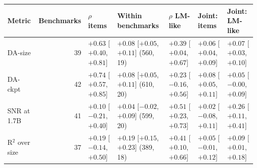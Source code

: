 \begin{tabular}{lrlllll}
\toprule
Metric & Benchmarks & $\rho$ items & Within benchmarks & $\rho$ LM-like & Joint: items & Joint: LM-like \\
\midrule
DA-size & 39 & $+0.63$ [$+0.40$, $+0.81$] & $+0.08$ [$+0.05$, $+0.11$] (560, 19) & $+0.39$ [$+0.04$, $+0.67$] & $+0.06$ [$+0.04$, $+0.09$] & $+0.07$ [$+0.03$, $+0.10$] \\
DA-ckpt & 42 & $+0.74$ [$+0.57$, $+0.85$] & $+0.08$ [$+0.05$, $+0.11$] (610, 20) & $+0.23$ [$-0.16$, $+0.56$] & $+0.08$ [$+0.05$, $+0.11$] & $+0.05$ [$-0.00$, $+0.09$] \\
SNR at 1.7B & 41 & $+0.10$ [$-0.21$, $+0.40$] & $+0.04$ [$-0.02$, $+0.09$] (599, 20) & $+0.51$ [$+0.23$, $+0.73$] & $+0.02$ [$-0.08$, $+0.11$] & $+0.26$ [$+0.11$, $+0.41$] \\
R$^2$ over size & 37 & $+0.19$ [$-0.14$, $+0.50$] & $+0.19$ [$+0.15$, $+0.23$] (389, 18) & $+0.41$ [$+0.10$, $+0.66$] & $+0.05$ [$-0.01$, $+0.12$] & $+0.09$ [$+0.01$, $+0.18$] \\
\bottomrule
\end{tabular}
